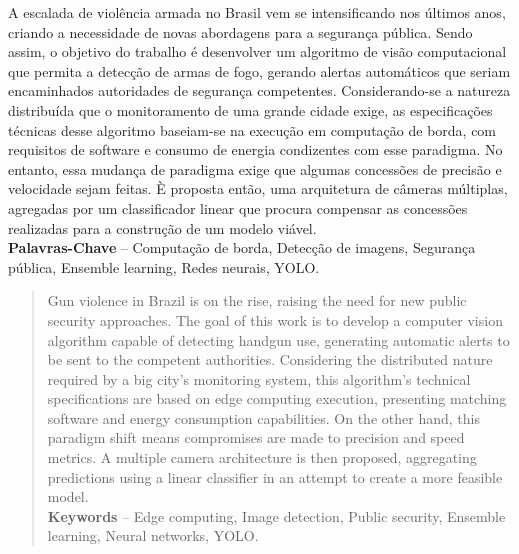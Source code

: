 \documentclass[]{politex}
\begin{document}
\begin{resumo}
A escalada de violência armada no Brasil vem se intensificando nos últimos anos, criando a necessidade de novas abordagens para a segurança pública. Sendo assim, o objetivo do trabalho é desenvolver um algoritmo de visão computacional que permita a detecção de armas de fogo, gerando alertas automáticos que seriam encaminhados autoridades de segurança competentes. Considerando-se a natureza distribuída que o monitoramento de uma grande cidade exige, as especificações técnicas desse algoritmo baseiam-se na execução em computação de borda, com requisitos de software e consumo de energia condizentes com esse paradigma. No entanto, essa mudança de paradigma exige que algumas concessões de precisão e velocidade sejam feitas. È proposta então, uma arquitetura de câmeras múltiplas, agregadas por um classificador linear que procura compensar as concessões realizadas para a construção de um modelo viável.
%
\\[3\baselineskip]
%
\textbf{Palavras-Chave} -- Computação de borda, Detecção de imagens, Segurança pública, Ensemble learning, Redes neurais, YOLO.
\end{resumo}

\begin{abstract}
Gun violence in Brazil is on the rise, raising the need for new public security approaches. The goal of this work is to develop a computer vision algorithm capable of detecting handgun use, generating automatic alerts to be sent to the competent authorities. Considering the distributed nature required by a big city's monitoring system, this algorithm's technical specifications are based on edge computing execution, presenting matching software and energy consumption capabilities. On the other hand, this paradigm shift means compromises are made to precision and speed metrics. A multiple camera architecture is then proposed, aggregating predictions using a linear classifier in an attempt to create a more feasible model.
%
\\[3\baselineskip]
%
\textbf{Keywords} -- Edge computing, Image detection, Public security, Ensemble learning, Neural networks, YOLO.
\end{abstract}

\listadetabelas
\listadefiguras

\sumario
\end{document}
